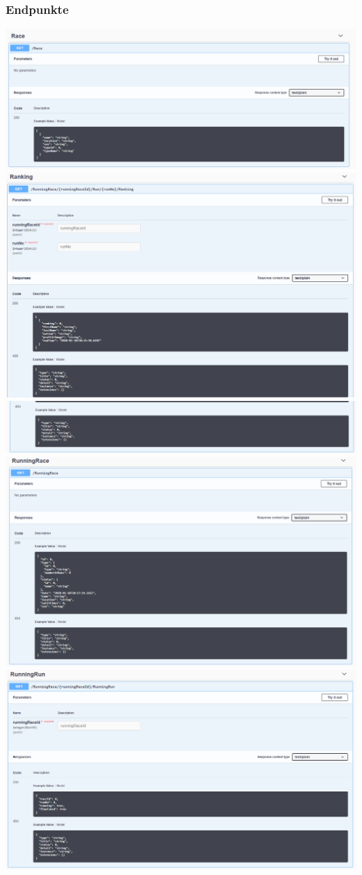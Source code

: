 \documentclass[a4paper, 12pt]{article}
\begin{document}
	\subsubsection{Endpunkte}
	\includegraphics[width=.7\textwidth]{img/Controller_race.png}
	\newline
	\includegraphics[width=.7\textwidth]{img/Controller_ranking_1.png}
	\newline
	\includegraphics[width=.7\textwidth]{img/Controller_ranking_2.png}
	\newline
	\includegraphics[width=.7\textwidth]{img/Controller_runningRace_get.png}
	\newline
	\includegraphics[width=.7\textwidth]{img/Controller_runningRun_get.png}
\end{document}
